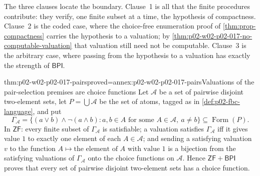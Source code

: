 The three clauses locate the boundary.  Clause~1 is all that the finite
procedures contribute: they verify, one finite subset at a time, the
hypothesis of compactness.  Clause~2 is the coded case, where the
choice-free enumeration proof of \cref{thm:prop-compactness} carries the
hypothesis to a valuation; by
\cref{thm:p02-w02-p02-017-no-computable-valuation} that valuation still
need not be computable.  Clause~3 is the arbitrary case, where passing
from the hypothesis to a valuation has exactly the strength of
\(\mathsf{BPI}\).

\begin{hblemma}{thm:p02-w02-p02-017-pairs}{proved=annex:p02-w02-p02-017-pairs}{Valuations of the pair-selection premises are choice functions}
Let \(\mathcal A\) be a set of pairwise disjoint two-element sets, let
\(P=\bigcup\mathcal A\) be the set of atoms, tagged as in
\cref{def:p02-fbc-language}, and put
\[
 \Gamma_{\mathcal A}=
 \{(a\lor b)\land\neg(a\land b):
   a,b\in A\text{ for some }A\in\mathcal A,\ a\ne b\}
 \subseteq\operatorname{Form}(P).
\]
In \(\mathsf{ZF}\): every finite subset of \(\Gamma_{\mathcal A}\) is
satisfiable; a valuation satisfies \(\Gamma_{\mathcal A}\) iff it gives
value \(1\) to exactly one element of each \(A\in\mathcal A\); and
sending a satisfying valuation \(v\) to the function
\(A\mapsto\text{the element of }A\text{ with value }1\) is a bijection
from the satisfying valuations of \(\Gamma_{\mathcal A}\) onto the
choice functions on \(\mathcal A\).  Hence \(\mathsf{ZF}+\mathsf{BPI}\)
proves that every set of pairwise disjoint two-element sets has a choice
function.
\end{hblemma}

